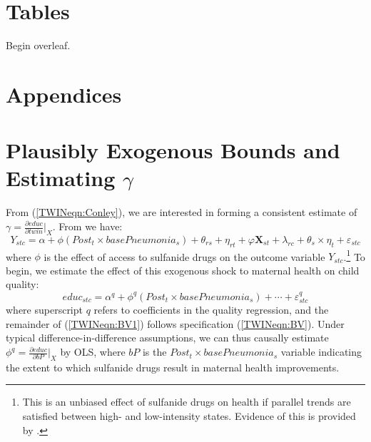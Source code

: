 \section*{Tables}
Begin overleaf.

\clearpage

\appendix
\section*{Appendices}
\section{Plausibly Exogenous Bounds and Estimating $\gamma$}
\label{TWINscn:gamma}
From (\ref{TWINeqn:Conley}), we are interested in forming a consistent estimate
of $\gamma=\frac{\partial educ}{\partial twin}\big|_{X}$. From 
\citet{BhalotraVenkataramani2014} we have:
\begin{equation}
\label{TWINeqn:BV}
Y_{stc} = \alpha + \phi (Post_t\times basePneumonia_s) +\theta_{rs} +\eta_{rt}
+\varphi\mathbf{X}_{st}+\lambda_{rc}+\theta_s\times\eta_t+\varepsilon_{stc}
\end{equation}
where $\phi$ is the effect of access to sulfanide drugs on the outcome variable 
$Y_{stc}$.\footnote{This is an unbiased effect of sulfanide drugs on health if
parallel trends are satisfied between high- and low-intensity states. Evidence of
this is provided by \citet{BhalotraVenkataramani2014}.}  To begin, we estimate 
the effect of this exogenous shock to maternal health on child quality:
\begin{equation}
\label{TWINeqn:BV1}
educ_{stc} = \alpha^q + \phi^q (Post_t\times basePneumonia_s) +\cdots+\varepsilon^q_{stc} 
\end{equation}
where superscript $q$ refers to coefficients in the quality regression, and the 
remainder of (\ref{TWINeqn:BV1}) follows specification (\ref{TWINeqn:BV}).  
Under typical difference-in-difference assumptions, we can thus causally 
estimate $\phi^q=\frac{\partial educ}{\partial bP}\big|_{X}$ by OLS, where $bP$ 
is the $Post_t\times basePneumonia_s$ variable indicating the extent to which
sulfanide drugs result in maternal health improvements.


